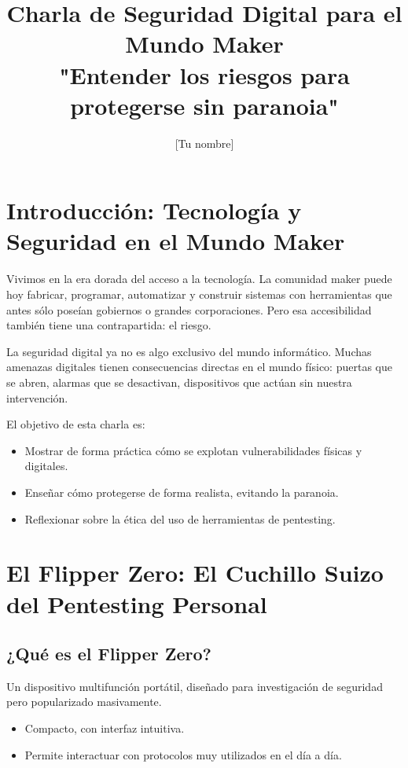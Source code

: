 \documentclass[a4paper,12pt]{article}
\title{\textbf{Charla de Seguridad Digital para el Mundo Maker \\ \large "Entender los riesgos para protegerse sin paranoia"}}
\author{[Tu nombre]}
\date{}
\begin{document}
\maketitle

\tableofcontents
\newpage

\section{Introducción: Tecnología y Seguridad en el Mundo Maker}

Vivimos en la era dorada del acceso a la tecnología. La comunidad maker puede hoy fabricar, programar, automatizar y construir sistemas con herramientas que antes sólo poseían gobiernos o grandes corporaciones. Pero esa accesibilidad también tiene una contrapartida: el riesgo.

La seguridad digital ya no es algo exclusivo del mundo informático. Muchas amenazas digitales tienen consecuencias directas en el mundo físico: puertas que se abren, alarmas que se desactivan, dispositivos que actúan sin nuestra intervención.

El objetivo de esta charla es:

\begin{itemize}
    \item Mostrar de forma práctica cómo se explotan vulnerabilidades físicas y digitales.
    \item Enseñar cómo protegerse de forma realista, evitando la paranoia.
    \item Reflexionar sobre la ética del uso de herramientas de pentesting.
\end{itemize}

\section{El Flipper Zero: El Cuchillo Suizo del Pentesting Personal}

\subsection{¿Qué es el Flipper Zero?}

Un dispositivo multifunción portátil, diseñado para investigación de seguridad pero popularizado masivamente.

\begin{itemize}
    \item Compacto, con interfaz intuitiva.
    \item Permite interactuar con protocolos muy utilizados en el día a día.
\end{itemize}
\end{document}
